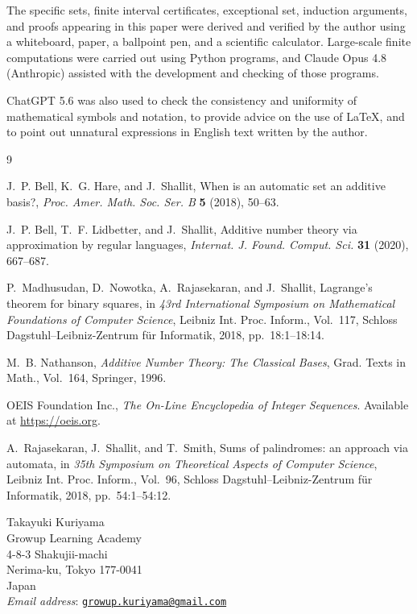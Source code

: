 \documentclass[12pt]{article}
\theoremstyle{plain}
\begin{document}
The specific sets, finite interval certificates, exceptional set,
induction arguments, and proofs appearing in this paper were derived
and verified by the author using a whiteboard, paper, a ballpoint pen,
and a scientific calculator. Large-scale finite computations were
carried out using Python programs, and Claude Opus 4.8 (Anthropic)
assisted with the development and checking of those programs.

ChatGPT 5.6 was also used to check the consistency and uniformity of
mathematical symbols and notation, to provide advice on the use of
\LaTeX{}, and to point out unnatural expressions in English text
written by the author.

\begin{thebibliography}{9}

J.~P. Bell, K.~G. Hare, and J.~Shallit,
When is an automatic set an additive basis?,
\emph{Proc. Amer. Math. Soc. Ser. B} \textbf{5} (2018), 50--63.

J.~P. Bell, T.~F. Lidbetter, and J.~Shallit,
Additive number theory via approximation by regular languages,
\emph{Internat. J. Found. Comput. Sci.} \textbf{31} (2020), 667--687.

P.~Madhusudan, D.~Nowotka, A.~Rajasekaran, and J.~Shallit,
Lagrange's theorem for binary squares,
in \emph{43rd International Symposium on Mathematical Foundations of
Computer Science}, Leibniz Int. Proc. Inform., Vol.~117, Schloss
Dagstuhl--Leibniz-Zentrum f{\"u}r Informatik, 2018, pp.~18:1--18:14.

M.~B. Nathanson,
\emph{Additive Number Theory: The Classical Bases},
Grad. Texts in Math., Vol.~164, Springer, 1996.

OEIS Foundation Inc.,
\emph{The On-Line Encyclopedia of Integer Sequences}.
Available at \url{https://oeis.org}.

A.~Rajasekaran, J.~Shallit, and T.~Smith,
Sums of palindromes: an approach via automata,
in \emph{35th Symposium on Theoretical Aspects of Computer Science},
Leibniz Int. Proc. Inform., Vol.~96, Schloss Dagstuhl--Leibniz-Zentrum
f{\"u}r Informatik, 2018, pp.~54:1--54:12.

\end{thebibliography}


\begin{flushleft}
Takayuki Kuriyama\\
Growup Learning Academy\\
4-8-3 Shakujii-machi\\
Nerima-ku, Tokyo 177-0041\\
Japan\\
\textit{Email address}: \href{mailto:growup.kuriyama@gmail.com}
{\texttt{growup.kuriyama@gmail.com}}
\end{flushleft}
\end{document}
